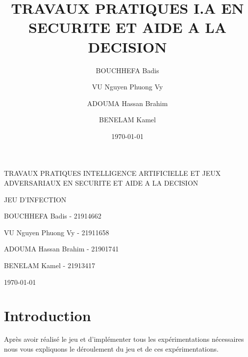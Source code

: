 \documentclass[11pt, pdflatex]{report}
\title{TRAVAUX PRATIQUES I.A EN SECURITE ET AIDE A LA DECISION}
\author{BOUCHHEFA Badis\and VU Nguyen Phuong Vy\and ADOUMA Hassan Brahim\and BENELAM Kamel}
\date{\today}
\begin{document}
\begin{titlepage}
    \vspace*{10em}
    \centering
    {\LARGE TRAVAUX PRATIQUES INTELLIGENCE ARTIFICIELLE ET JEUX ADVERSARIAUX EN SECURITE ET AIDE A LA DECISION\par}
    \vspace{1cm}
    {\scshape\Large JEU D'INFECTION\par}
    \vspace{1cm}
	{\Large BOUCHHEFA Badis - 21914662 \par}
	{\Large VU Nguyen Phuong Vy - 21911658\par}
	{\Large ADOUMA Hassan Brahim - 21901741\par}
	{\Large BENELAM Kamel - 21913417\par}
    \vspace{1cm}
	{\large \today \par}
\end{titlepage}

\pagebreak

\tableofcontents

\pagebreak
\section{Introduction}
Après avoir réalisé le jeu et d’implémenter tous les expérimentations nécessaires nous vous expliquons le déroulement du jeu et de ces expérimentations.
\end{document}
